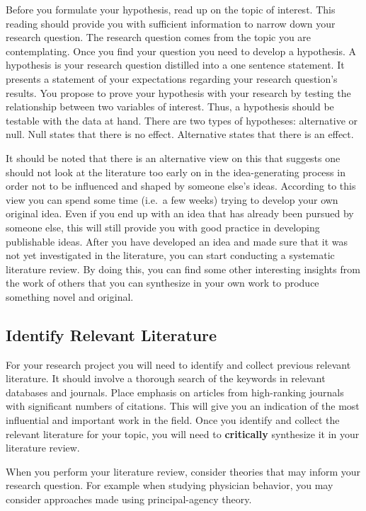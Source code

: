 \documentclass[
]{book}
\begin{document}
Before you formulate your hypothesis, read up on the topic of interest.
This reading should provide you with sufficient information to narrow
down your research question. The research question comes from the topic
you are contemplating. Once you find your question you need to develop a
hypothesis. A hypothesis is your research question distilled into a one
sentence statement. It presents a statement of your expectations
regarding your research question's results. You propose to prove your
hypothesis with your research by testing the relationship between two
variables of interest. Thus, a hypothesis should be testable with the
data at hand. There are two types of hypotheses: alternative or null.
Null states that there is no effect. Alternative states that there is an
effect.

It should be noted that there is an alternative view on this that
suggests one should not look at the literature too early on in the
idea-generating process in order not to be influenced and shaped by
someone else's ideas. According to this view you can spend some time
(i.e.~a few weeks) trying to develop your own original idea. Even if you
end up with an idea that has already been pursued by someone else, this
will still provide you with good practice in developing publishable
ideas. After you have developed an idea and made sure that it was not
yet investigated in the literature, you can start conducting a
systematic literature review. By doing this, you can find some other
interesting insights from the work of others that you can synthesize in
your own work to produce something novel and original.

\hypertarget{identify-relevant-literature}{%
\subsection{Identify Relevant
Literature}\label{identify-relevant-literature}}

For your research project you will need to identify and collect previous
relevant literature. It should involve a thorough search of the keywords
in relevant databases and journals. Place emphasis on articles from
high-ranking journals with significant numbers of citations. This will
give you an indication of the most influential and important work in the
field. Once you identify and collect the relevant literature for your
topic, you will need to \textbf{critically} synthesize it in your
literature review.

When you perform your literature review, consider theories that may
inform your research question. For example when studying physician
behavior, you may consider approaches made using principal-agency
theory.
\end{document}
